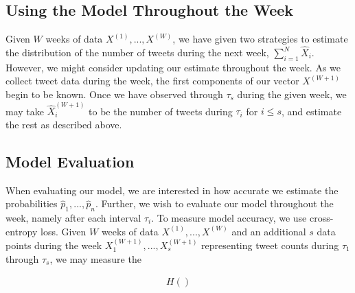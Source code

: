 \documentclass{article}
\begin{document}
\subsection{Using the Model Throughout the Week}
Given $W$ weeks of data $X^{(1)},...,X^{(W)}$, we have given two strategies to estimate
the distribution of the number of tweets during the next week,
$\sum_{i=1}^N \hat{X}_i$. However, we might consider updating our estimate
throughout the week. As we collect tweet data during the week, the first
components of our vector $X^{(W+1)}$ begin to be known. Once we have observed
through $\tau_s$ during the given week, we may take
$\hat{X}_i^{(W+1)}$ to be the number of tweets during $\tau_i$ for $i \leq s$,
and estimate the rest as described above.

\subsection{Model Evaluation}
When evaluating our model, we are interested in how accurate we estimate
the probabilities $\hat{p}_1,...,\hat{p}_n$. Further, we wish to evaluate
our model throughout the week, namely after each interval $\tau_i$.
To measure model accuracy, we use cross-entropy loss. Given
$W$ weeks of data $X^{(1)},...,X^{(W)}$ and an additional
$s$ data points during the week $X_1^{(W+1)},...,X_s^{(W+1)}$ representing
tweet counts during $\tau_1$ through $\tau_s$, we may measure the

\begin{align*}
H()
\end{align*}

 

\end{document}
